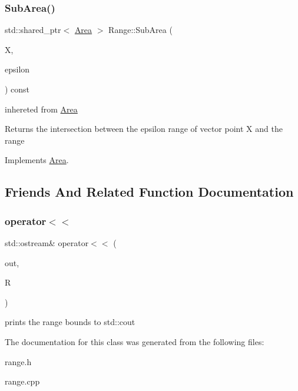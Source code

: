 \subsubsection{\texorpdfstring{Sub\+Area()}{SubArea()}}
{\footnotesize\ttfamily std\+::shared\+\_\+ptr$<$ \hyperlink{class_area}{Area} $>$ Range\+::\+Sub\+Area (\begin{DoxyParamCaption}\item[{const \hyperlink{classv_point}{v\+Point} \&}]{X,  }\item[{double}]{epsilon }\end{DoxyParamCaption}) const\hspace{0.3cm}{\ttfamily [virtual]}}

inhereted from \hyperlink{class_area}{Area} \begin{DoxyReturn}{Returns}
the intersection between the epsilon range of vector point X and the range 
\end{DoxyReturn}


Implements \hyperlink{class_area_a8f28e6be12d6b1bf7217f51307ab937e}{Area}.



\subsection{Friends And Related Function Documentation}
\mbox{\label{class_range_a4720a1c61f7e023f4ae120b4eeb5a1da}} 
\subsubsection{\texorpdfstring{operator$<$$<$}{operator<<}}
{\footnotesize\ttfamily std\+::ostream\& operator$<$$<$ (\begin{DoxyParamCaption}\item[{std\+::ostream \&}]{out,  }\item[{std\+::shared\+\_\+ptr$<$ \hyperlink{class_range}{Range} $>$}]{R }\end{DoxyParamCaption})\hspace{0.3cm}{\ttfamily [friend]}}

prints the range bounds to std\+::cout 

The documentation for this class was generated from the following files\+:\begin{DoxyCompactItemize}
\item 
range.\+h\item 
range.\+cpp\end{DoxyCompactItemize}
